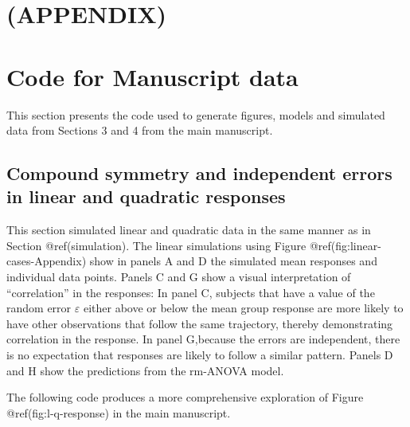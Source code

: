 \documentclass[Royal,times,sagev]{sagej}
\begin{document}
\hypertarget{appendix}{%
\section{(APPENDIX)}\label{appendix}}

\hypertarget{code-for-manuscript-data}{%
\section{Code for Manuscript data}\label{code-for-manuscript-data}}

This section presents the code used to generate figures, models and
simulated data from Sections 3 and 4 from the main manuscript.

\hypertarget{compound-symmetry-and-independent-errors-in-linear-and-quadratic-responses}{%
\subsection{Compound symmetry and independent errors in linear and
quadratic
responses}\label{compound-symmetry-and-independent-errors-in-linear-and-quadratic-responses}}

This section simulated linear and quadratic data in the same manner as
in Section @ref(simulation). The linear simulations using Figure
@ref(fig:linear-cases-Appendix) show in panels A and D the simulated
mean responses and individual data points. Panels C and G show a visual
interpretation of ``correlation'' in the responses: In panel C, subjects
that have a value of the random error \(\varepsilon\) either above or
below the mean group response are more likely to have other observations
that follow the same trajectory, thereby demonstrating correlation in
the response. In panel G,because the errors are independent, there is no
expectation that responses are likely to follow a similar pattern.
Panels D and H show the predictions from the rm-ANOVA model.

The following code produces a more comprehensive exploration of Figure
@ref(fig:l-q-response) in the main manuscript.
\end{document}
